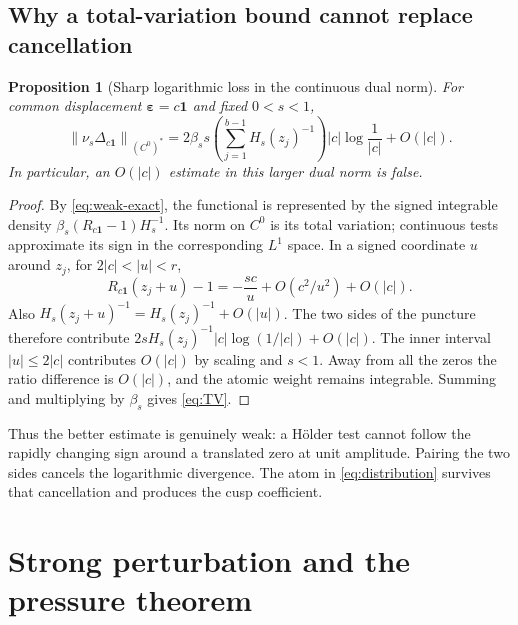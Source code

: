 \documentclass[11pt,a4paper]{article}
\numberwithin{equation}{section}
\newtheorem{proposition}[proposition]{Proposition}
\theoremstyle{definition}
\theoremstyle{remark}
\newcommand{\norm}[1]{\left\lVert#1\right\rVert}
\newcommand{\eps}{\boldsymbol\varepsilon}
\begin{document}
\subsection{Why a total-variation bound cannot replace cancellation}
\begin{proposition}[Sharp logarithmic loss in the continuous dual norm]
\label{prop:TV}
For common displacement $\eps=c\mathbf1$ and fixed $0<s<1$,
\begin{equation}
 \norm{\nu_s\Delta_{c\mathbf1}}_{(C^0)^*}
 =2\beta_s s\left(\sum_{j=1}^{b-1}H_s(z_j)^{-1}\right)
       |c|\log\frac1{|c|}+O(|c|).
 \label{eq:TV}
\end{equation}
In particular, an $O(|c|)$ estimate in this larger dual norm is false.
\end{proposition}
\begin{proof}
By \cref{eq:weak-exact}, the functional is represented by the signed
integrable density $\beta_s(R_{c\mathbf1}-1)H_s^{-1}$. Its norm on
$C^0$ is its total variation; continuous tests approximate its sign
in the corresponding $L^1$ space.
In a signed coordinate $u$ around $z_j$, for
$2|c|<|u|<r$,
\[
 R_{c\mathbf1}(z_j+u)-1=-\frac{sc}{u}
                  +O(c^2/u^2)+O(|c|).
\]
Also $H_s(z_j+u)^{-1}=H_s(z_j)^{-1}+O(|u|)$.
The two sides of the puncture therefore contribute
$2sH_s(z_j)^{-1}|c|\log(1/|c|)+O(|c|)$.
The inner interval $|u|\leq2|c|$ contributes $O(|c|)$ by scaling and
$s<1$. Away from all the zeros the ratio difference is $O(|c|)$,
and the atomic weight remains integrable. Summing and multiplying by
$\beta_s$ gives \cref{eq:TV}.
\end{proof}

Thus the better estimate is genuinely weak: a H\"older test cannot
follow the rapidly changing sign around a translated zero at unit
amplitude. Pairing the two sides cancels the logarithmic divergence.
The atom in \cref{eq:distribution} survives that cancellation and
produces the cusp coefficient.

\section{Strong perturbation and the pressure theorem}
\label{sec:proof-main}
\end{document}
